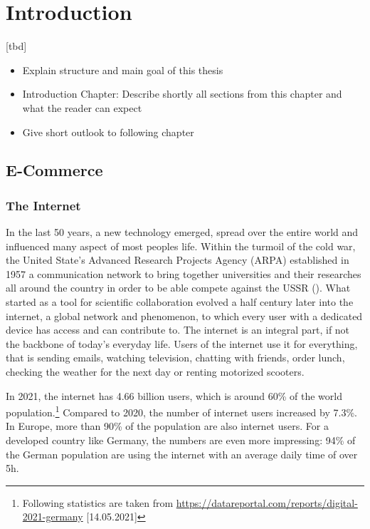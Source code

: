 \chapter{Introduction}

[tbd]

\begin{itemize}
	\item Explain structure and main goal of this thesis
	\item Introduction Chapter: Describe shortly all sections from this chapter and what the reader can expect
	\item Give short outlook to following chapter
\end{itemize}




\section{E-Commerce}


\subsection{The Internet}

In the last 50 years, a new technology emerged, spread over the entire world and influenced many aspect of most peoples life.
Within the turmoil of the cold war, the United State's Advanced Research Projects Agency (ARPA) established in 1957 a communication network to bring together universities and their researches all around the country in order to be able compete against the USSR (\cite{2011Cohen}). %
What started as a tool for scientific collaboration evolved a half century later into the internet, a global network and phenomenon, to which every user with a dedicated device has access and can contribute to.
The internet is an integral part, if not the backbone of today's everyday life.
Users of the internet use it for everything, that is sending emails, watching television, chatting with friends, 
order lunch, checking the weather for the next day or renting motorized scooters.


In 2021, the internet has 4.66 billion users, which is around 60\% of the world population.\footnote{Following statistics are taken from \url{https://datareportal.com/reports/digital-2021-germany} [14.05.2021]}
Compared to 2020, the number of internet users increased by 7.3\%.
In Europe, more than 90\% of the population are also internet users.
For a developed country like Germany, the numbers are even more impressing:
94\% of the German population are using the internet with an average daily time of over 5h.

